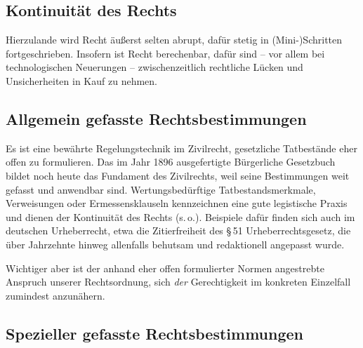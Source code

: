 \documentclass[output=paper]{langscibook}
\begin{document}
\hypertarget{kontinuituxe4t-des-rechts}{%
\subsection{Kontinuität des Rechts}\label{kontinuituxe4t-des-rechts}}

Hierzulande wird Recht äußerst selten abrupt, dafür stetig in
(Mini-)Schritten fortgeschrieben. Insofern ist Recht berechenbar, dafür
sind -- vor allem bei technologischen Neuerungen -- zwischenzeitlich
rechtliche Lücken und Unsicherheiten in Kauf zu nehmen.

\hypertarget{allgemein-gefasste-rechtsbestimmungen}{%
\subsection{Allgemein gefasste
Rechtsbestimmungen}\label{allgemein-gefasste-rechtsbestimmungen}}

Es ist eine bewährte Regelungstechnik im Zivilrecht, gesetzliche
Tatbestände eher offen zu formulieren. Das im Jahr 1896 ausgefertigte
Bürgerliche Gesetzbuch bildet noch heute das Fundament des Zivilrechts,
weil seine Bestimmungen weit gefasst und anwendbar sind.
Wertungsbedürftige Tatbestandsmerkmale, Verweisungen oder
Ermessensklauseln kennzeichnen eine gute legistische Praxis und dienen
der Kontinuität des Rechts (s.\,o.). Beispiele dafür finden sich auch im
deutschen Urheberrecht, etwa die Zitierfreiheit des §\,51
Urheberrechtsgesetz, die über Jahrzehnte hinweg allenfalls behutsam und
redaktionell angepasst wurde.

Wichtiger aber ist der anhand eher offen formulierter Normen angestrebte
Anspruch unserer Rechtsordnung, sich \emph{der} Gerechtigkeit im
konkreten Einzelfall zumindest anzunähern.

\hypertarget{spezieller-gefasste-rechtsbestimmungen}{%
\subsection{Spezieller gefasste
Rechtsbestimmungen}\label{spezieller-gefasste-rechtsbestimmungen}}
\end{document}
